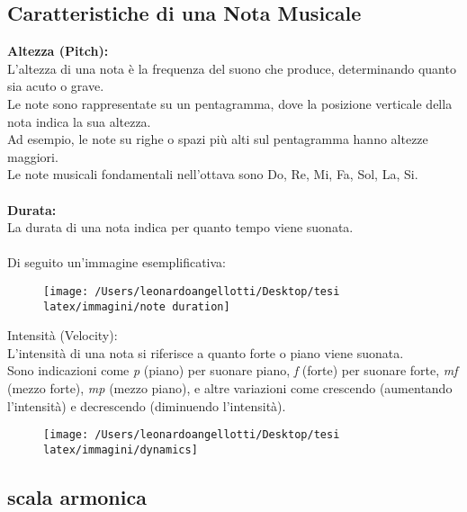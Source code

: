 \documentclass[a4paper,12pt]{report}
\begin{document}
\subsection{Caratteristiche di una Nota Musicale}

\textbf{Altezza (Pitch):} \\
L'altezza di una nota è la frequenza del suono che produce, determinando quanto sia acuto o grave. \\
Le note sono rappresentate su un pentagramma, dove la posizione verticale della nota indica la sua altezza. \\
Ad esempio, le note su righe o spazi più alti sul pentagramma hanno altezze maggiori. \\
Le note musicali fondamentali nell'ottava sono Do, Re, Mi, Fa, Sol, La, Si. \\
\\
\textbf{Durata:}\\
La durata di una nota indica per quanto tempo viene suonata. \\
\\
Di seguito un'immagine esemplificativa:

\begin{figure}[H]
    \centering
    \texttt{[image: /Users/leonardoangellotti/Desktop/tesi latex/immagini/note duration]} 
    \label{fig:immagine4}
\end{figure}

Intensità (Velocity): \\
L'intensità di una nota si riferisce a quanto forte o piano viene suonata. \\
Sono indicazioni come \textit{p} (piano) per suonare piano, \textit{f} (forte) per suonare forte, \textit{mf} (mezzo forte), \textit{mp} (mezzo piano), e altre variazioni come crescendo (aumentando l'intensità) e decrescendo (diminuendo l'intensità).

\begin{figure}[H]
    \centering
    \texttt{[image: /Users/leonardoangellotti/Desktop/tesi latex/immagini/dynamics]} 
    \label{fig:immagine5}
\end{figure}

\subsection{scala armonica}
\end{document}
